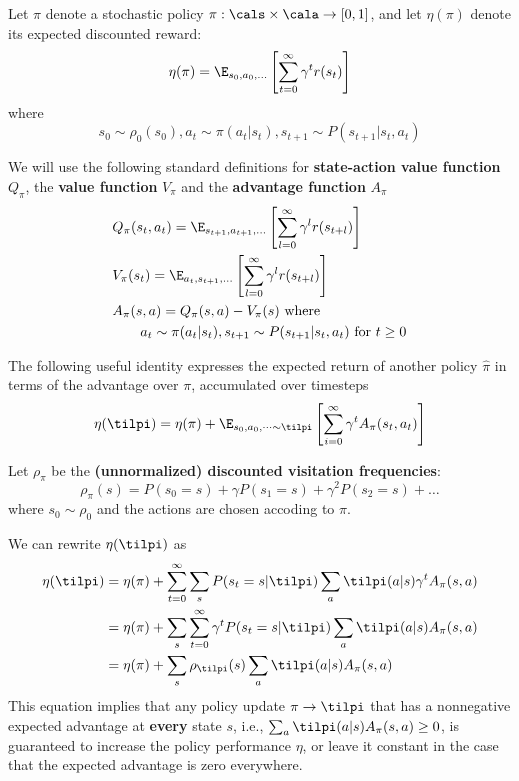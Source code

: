 \documentclass[11pt]{article}
\begin{document}
Let
\(\pi\)
denote a stochastic policy \(\pi:\cals\times\cala\to[0,1]\), and let \(\eta(\pi)\) denote its expected discounted reward:
\begin{equation*}
\eta(\pi)=\E_{s_0,a_0,\dots}\left[\sum_{t=0}^\infty\gamma^tr(s_t)\right]
\end{equation*}
where
\begin{equation*}
s_0\sim\rho_0(s_0),a_t\sim\pi(a_t|s_t),s_{t+1}\sim P(s_{t+1}|s_t,a_t)
\end{equation*}

We will use the following standard definitions for \textbf{state-action value function} \(Q_\pi\), the \textbf{value function}
\(V_{\pi}\) and the \textbf{advantage function} \(A_\pi\)
\begin{align*}
&Q_\pi(s_t,a_t)=\E_{s_{t+1},a_{t+1},\dots}\left[\sum_{l=0}^\infty\gamma^lr(s_{t+l})\right]\\
&V_\pi(s_t)=\E_{a_t,s_{t+1},\dots}\left[\sum_{l=0}^\infty\gamma^lr(s_{t+l})\right]\\
&A_\pi(s,a)=Q_\pi(s,a)-V_\pi(s)\text{ where }\\
&\quad\quad a_t\sim\pi(a_t|s_t),s_{t+1}\sim P(s_{t+1}|s_t,a_t)\text{ for }t\ge 0
\end{align*}

The following useful identity expresses the expected return of another policy \(\hat{\pi}\) in terms of the
advantage over \(\pi\), accumulated over timesteps
\begin{equation*}
\eta(\tilpi)=\eta(\pi)+\E_{s_0,a_0,\dots\sim\tilpi}\left[\sum_{i=0}^\infty\gamma^tA_\pi(s_t,a_t)\right]
\end{equation*}

Let \(\rho_\pi\) be the \textbf{(unnormalized) discounted visitation frequencies}:
\begin{equation*}
\rho_\pi(s)=P(s_0=s)+\gamma P(s_1=s)+\gamma^2P(s_2=s)+\dots
\end{equation*}
where \(s_0\sim\rho_0\) and the actions are chosen accoding to \(\pi\).


We can rewrite \(\eta(\tilpi)\) as
\begin{align}
\eta(\tilpi)&=\eta(\pi)+\sum_{t=0}^\infty\sum_sP(s_t=s|\tilpi)\sum_a\tilpi(a|s)\gamma^tA_\pi(s,a)\notag\\
&=\eta(\pi)+\sum_s\sum_{t=0}^\infty\gamma^tP(s_t=s|\tilpi)\sum_a\tilpi(a|s)A_\pi(s,a)\notag\\
&=\eta(\pi)+\sum_s\rho_{\tilpi}(s)\sum_{a}\tilpi(a|s)A_\pi(s,a)\label{eq2}
\end{align}
This equation implies that any policy update \(\pi\to\tilpi\) that has a nonnegative expected advantage at \textbf{every}
state \(s\), i.e., \(\sum_a\tilpi(a|s)A_\pi(s,a)\ge 0\), is guaranteed to increase the policy performance \(\eta\), or leave
it constant in the case that the expected advantage is zero everywhere.
\end{document}
